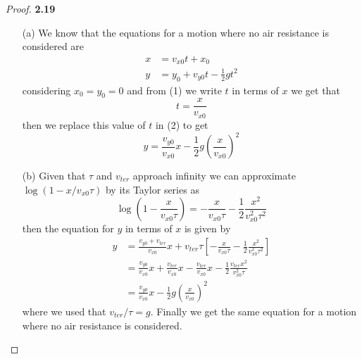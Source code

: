 \documentclass[11pt]{article}
\theoremstyle{definition}
\begin{document}
	\begin{proof}{\textbf{2.19}}
        \begin{itemize}
            \item[(a)] We know that the equations for a motion where no air
            resistance is considered are
            \begin{align}
                x &= v_{x0}t + x_0\\
                y &= y_0 + v_{y0}t - \frac{1}{2}gt^2
            \end{align}
            considering $x_0 = y_0 = 0$ and from (1) we write $t$ in terms of
            $x$ we get that
            $$t = \frac{x}{v_{x0}}$$
            then we replace this value of $t$ in (2) to get
            $$y = \frac{v_{y0}}{v_{x0}}x - \frac{1}{2}g\left(\frac{x}{v_{x0}}\right)^2$$
            \item[(b)] Given that $\tau$ and $v_{ter}$ approach infinity we can
            approximate\\
            $\log(1 - x/v_{x0}\tau)$ by its Taylor series as
            $$\log(1 - \frac{x}{v_{x0}\tau}) = -\frac{x}{v_{x0}\tau} - \frac{1}{2}\frac{x^2}{v_{x0}^2\tau^2}$$
            then the equation for $y$ in terms of $x$ is given by
            \begin{align*}
                y &= \frac{v_{y0} + v_{ter}}{v_{x0}}x + v_{ter}\tau\left[-\frac{x}{v_{x0}\tau} - \frac{1}{2}\frac{x^2}{v_{x0}^2\tau^2}\right]\\
                  &= \frac{v_{y0}}{v_{x0}}x + \frac{v_{ter}}{v_{x0}}x -
                  \frac{v_{ter}}{v_{x0}}x - \frac{1}{2}\frac{v_{ter}x^2}{v_{x0}^2\tau}\\
                  &= \frac{v_{y0}}{v_{x0}}x - \frac{1}{2}g\left(\frac{x}{v_{x0}}\right)^2
            \end{align*}
            where we used that $v_{ter}/\tau = g$. Finally we get the same
            equation for a motion where no air resistance is considered.
        \end{itemize}
    \end{proof}
\cleardoublepage
\end{document}
